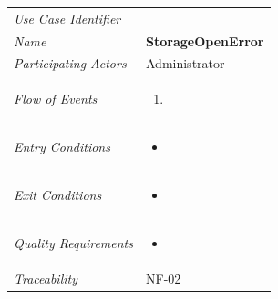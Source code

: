\documentclass[12pt,letterpaper]{article}
\begin{document}
\begin{center}
	\begin{tabu} to 
		\toprule
		Use Case Identifier & \storageopenerror{} \\
		Name & {\bf StorageOpenError} \\
		Participating Actors & Administrator \\
		Flow of Events & 
	    \begin{enumerate}[topsep=-1em,leftmargin=*]
		    \item 
		\end{enumerate} \\

		Entry Conditions &
		\begin{itemize}[topsep=-1em,leftmargin=*]
		    \item 
        \end{itemize} \\

		Exit Conditions &
		\begin{itemize}[topsep=-1em,leftmargin=*]
		    \item 
        \end{itemize} \\

		Quality Requirements &
		\begin{itemize}[topsep=-1em,leftmargin=*]
		    \item 
        \end{itemize} \\

		Traceability & NF-02 \\
		\toprule
	\end{tabu}
\end{center}
\end{document}
